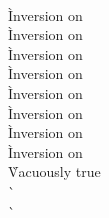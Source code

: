 \begin{description}
\item[] \ \\

  \begin{tabbing}
    \` Inversion on  \\
    \` Inversion on  \\
    \` Inversion on  \\
    \` Inversion on  \\
    \` Inversion on  \\
    \` Inversion on  \\
    \` Inversion on  \\
    \` Inversion on  \\
    \` Vacuously true \\
    \`  \\
    \`  \\
  \end{tabbing}


\end{description}
